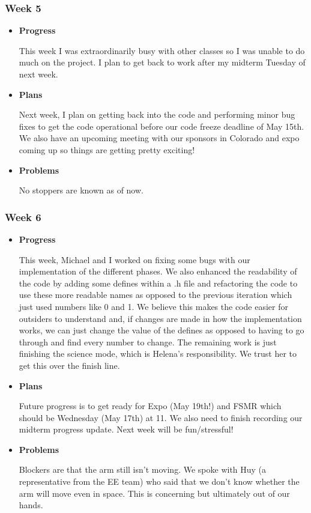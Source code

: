 \subsubsection{Week 5}
\begin{itemize}
	\item{
		\textbf{Progress}


		This week I was extraordinarily busy with other classes so I was unable to do much on the project. I plan to get 
		back to work after my midterm Tuesday of next week.
	}
	\item{
		\textbf{Plans}


		Next week, I plan on getting back into the code and performing minor bug fixes to get the code operational before 
		our code freeze deadline of May 15th. We also have an upcoming meeting with our sponsors in Colorado and expo 
		coming up so things are getting pretty exciting!
	}
	\item{
		\textbf{Problems}


		No stoppers are known as of now.
	}

\end{itemize}
\subsubsection{Week 6}
\begin{itemize}
	\item{
		\textbf{Progress}


		This week, Michael and I worked on fixing some bugs with our implementation of the different phases. We also 
		enhanced the readability of the code by adding some defines within a .h file and refactoring the code to use these 
		more readable names as opposed to the previous iteration which just used numbers like 0 and 1. We believe this 
		makes the code easier for outsiders to understand and, if changes are made in how the implementation works, we can 
		just change the value of the defines as opposed to having to go through and find every number to change. The 
		remaining work is just finishing the science mode, which is Helena's responsibility. We trust her to get this over 
		the finish line.
	}
	\item{
		\textbf{Plans}


		Future progress is to get ready for Expo (May 19th!) and FSMR which should be Wednesday (May 17th) at 11. We also
		 need to finish recording our midterm progress update. Next week will be fun/stressful!
	}
	\item{
		\textbf{Problems}

		
		Blockers are that the arm still isn't moving. We spoke with Huy (a representative from the EE team) who said that 
		we don't know whether the arm will move even in space. This is concerning but ultimately out of our hands.
	}

\end{itemize}

